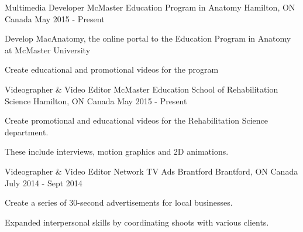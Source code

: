 


\begin{cventries}


\cventry
{Multimedia Developer} %
{McMaster Education Program in Anatomy} %
{Hamilton, ON Canada} %
{May 2015 - Present} %
{ %
	\begin{cvitems}
		\item {Develop MacAnatomy, the online portal to the Education Program 
		in Anatomy at McMaster University}
		\item {Create educational and promotional videos for the program}
	\end{cvitems}
}


\cventry
{Videographer \& Video Editor} %
{McMaster Education School of Rehabilitation Science} %
{Hamilton, ON Canada} %
{May 2015 - Present} %
{ %
	\begin{cvitems}
		\item {Create promotional and educational videos for the Rehabilitation 
		Science 
			department.}
		\item {These include interviews, motion graphics and 2D animations.}
	\end{cvitems}
}


\cventry
{Videographer \& Video Editor} %
{Network TV Ads Brantford} %
{Brantford, ON Canada} %
{July 2014 - Sept 2014} %
{ %
	\begin{cvitems}
		\item {Create a series of 30-second advertisements for local 
		businesses.}
		\item {Expanded interpersonal skills by coordinating shoots with 
		various clients.}
	\end{cvitems} 
}


\end{cventries}
